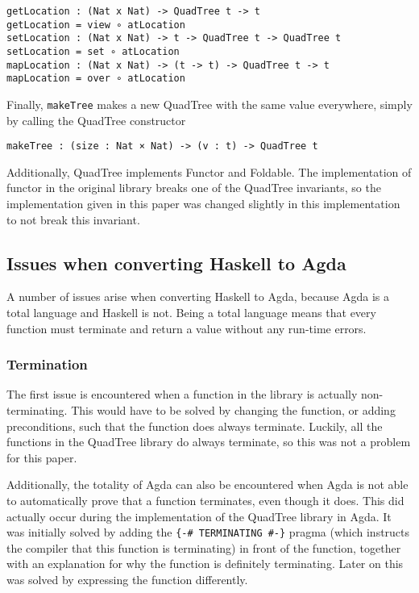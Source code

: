 \begin{verbatim}
getLocation : (Nat x Nat) -> QuadTree t -> t
getLocation = view ∘ atLocation
setLocation : (Nat x Nat) -> t -> QuadTree t -> QuadTree t
setLocation = set ∘ atLocation
mapLocation : (Nat x Nat) -> (t -> t) -> QuadTree t -> t
mapLocation = over ∘ atLocation
\end{verbatim}
Finally,  \verb|makeTree| makes a new QuadTree with the same value everywhere, simply by calling the QuadTree constructor
\begin{verbatim}
makeTree : (size : Nat × Nat) -> (v : t) -> QuadTree t
\end{verbatim}

Additionally, QuadTree implements Functor and Foldable. The implementation of functor in the original library breaks one of the QuadTree invariants, so the implementation given in this paper was changed slightly in this implementation to not break this invariant.

\label{total-functions}
\subsection{Issues when converting Haskell to Agda}
A number of issues arise when converting Haskell to Agda, because Agda is a total language and Haskell is not. Being a total language means that every function must terminate and return a value without any run-time errors.

\subsubsection{Termination}
The first issue is encountered when a function in the library is actually non-terminating. This would have to be solved by changing the function, or adding preconditions, such that the function does always terminate. Luckily, all the functions in the QuadTree library do always terminate, so this was not a problem for this paper.

Additionally, the totality of Agda can also be encountered when Agda is not able to automatically prove that a function terminates, even though it does. This did actually occur during the implementation of the QuadTree library in Agda. It was initially solved by adding the \verb|{-# TERMINATING #-}| pragma (which instructs the compiler that this function is terminating) in front of the function, together with an explanation for why the function is definitely terminating. Later on this was solved by expressing the function differently.

